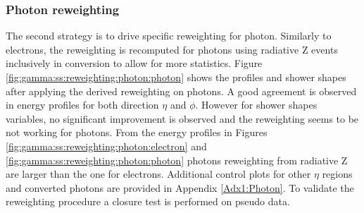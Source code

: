 \subsubsection{Photon reweighting}
The second strategy is to drive specific reweighting for photon. Similarly to electrons, the reweighting is recomputed for photons using radiative Z events inclusively in conversion to allow for more statistics. Figure \ref{fig:gamma:ss:reweighting:photon:photon} shows the profiles and shower shapes after applying the derived reweighting on photons. A good agreement is observed in energy profiles for both direction $\eta$ and $\phi$. However for shower shapes variables, no significant improvement is observed and the reweighting seems to be not working for photons. From the energy profiles in Figures \ref{fig:gamma:ss:reweighting:photon:electron} and \ref{fig:gamma:ss:reweighting:photon:photon} photons reweighting from radiative Z are larger than the one for electrons. Additional control plots for other $\eta$ regions and converted photons are provided in Appendix \ref{Adx1:Photon}. To validate the reweighting procedure a closure test is performed on pseudo data.
